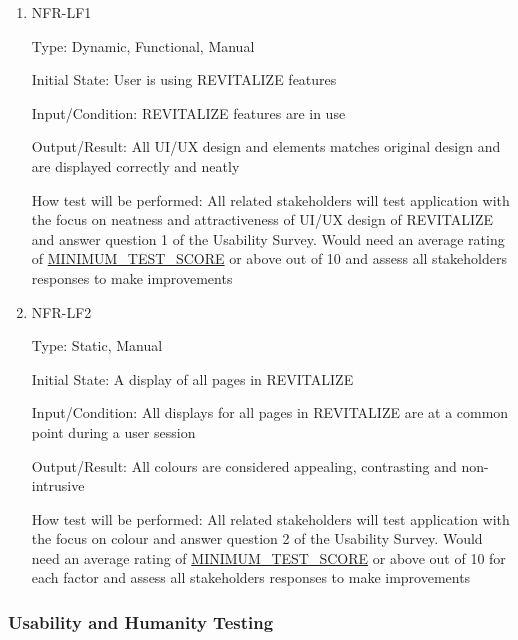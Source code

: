 \documentclass[12pt, titlepage]{article}
\begin{document}
\begin{enumerate}
	
	\item{NFR-LF1\\}
	
	Type: Dynamic, Functional, Manual
	
	Initial State: User is using REVITALIZE features
	
	Input/Condition: REVITALIZE features are in use
	
	Output/Result: All UI/UX design and elements matches original design and are displayed correctly and neatly
	
	How test will be performed: All related stakeholders will test application with the focus on neatness and attractiveness of UI/UX design of REVITALIZE and answer question 1 of the Usability Survey. Would need an average rating of \hyperlink{MINIMUM_TEST_SCORE}{MINIMUM\_TEST\_SCORE} or above out of 10 and assess all stakeholders responses to make improvements
	
	\item{NFR-LF2\\}
	
	Type: Static, Manual
	
	Initial State: A display of all pages in REVITALIZE
	
	Input/Condition: All displays for all pages in REVITALIZE are at a common point during a user session
	
	Output/Result: All colours are considered appealing, contrasting and non-intrusive
	
	How test will be performed: All related stakeholders will test application with the focus on colour and answer question 2 of the Usability Survey. Would need an average rating of \hyperlink{MINIMUM_TEST_SCORE}{MINIMUM\_TEST\_SCORE} or above out of 10 for each factor and assess all stakeholders responses to make improvements
	
\end{enumerate}

\subsubsection{Usability and Humanity Testing}
\end{document}
